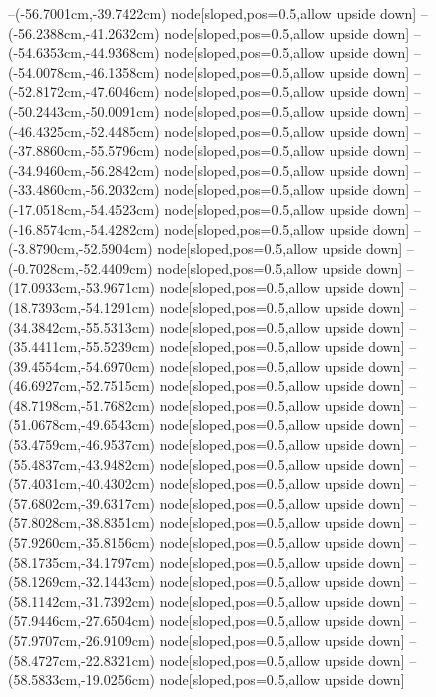 --(-56.7001cm,-39.7422cm) node[sloped,pos=0.5,allow upside down]{\ArrowIn}
--(-56.2388cm,-41.2632cm) node[sloped,pos=0.5,allow upside down]{\ArrowIn}
--(-54.6353cm,-44.9368cm) node[sloped,pos=0.5,allow upside down]{\ArrowIn}
--(-54.0078cm,-46.1358cm) node[sloped,pos=0.5,allow upside down]{\ArrowIn}
--(-52.8172cm,-47.6046cm) node[sloped,pos=0.5,allow upside down]{\ArrowIn}
--(-50.2443cm,-50.0091cm) node[sloped,pos=0.5,allow upside down]{\ArrowIn}
--(-46.4325cm,-52.4485cm) node[sloped,pos=0.5,allow upside down]{\ArrowIn}
--(-37.8860cm,-55.5796cm) node[sloped,pos=0.5,allow upside down]{\ArrowIn}
--(-34.9460cm,-56.2842cm) node[sloped,pos=0.5,allow upside down]{\ArrowIn}
--(-33.4860cm,-56.2032cm) node[sloped,pos=0.5,allow upside down]{\ArrowIn}
--(-17.0518cm,-54.4523cm) node[sloped,pos=0.5,allow upside down]{\ArrowIn}
--(-16.8574cm,-54.4282cm) node[sloped,pos=0.5,allow upside down]{\arrowIn}
--(-3.8790cm,-52.5904cm) node[sloped,pos=0.5,allow upside down]{\ArrowIn}
--(-0.7028cm,-52.4409cm) node[sloped,pos=0.5,allow upside down]{\ArrowIn}
--(17.0933cm,-53.9671cm) node[sloped,pos=0.5,allow upside down]{\ArrowIn}
--(18.7393cm,-54.1291cm) node[sloped,pos=0.5,allow upside down]{\ArrowIn}
--(34.3842cm,-55.5313cm) node[sloped,pos=0.5,allow upside down]{\ArrowIn}
--(35.4411cm,-55.5239cm) node[sloped,pos=0.5,allow upside down]{\ArrowIn}
--(39.4554cm,-54.6970cm) node[sloped,pos=0.5,allow upside down]{\ArrowIn}
--(46.6927cm,-52.7515cm) node[sloped,pos=0.5,allow upside down]{\ArrowIn}
--(48.7198cm,-51.7682cm) node[sloped,pos=0.5,allow upside down]{\ArrowIn}
--(51.0678cm,-49.6543cm) node[sloped,pos=0.5,allow upside down]{\ArrowIn}
--(53.4759cm,-46.9537cm) node[sloped,pos=0.5,allow upside down]{\ArrowIn}
--(55.4837cm,-43.9482cm) node[sloped,pos=0.5,allow upside down]{\ArrowIn}
--(57.4031cm,-40.4302cm) node[sloped,pos=0.5,allow upside down]{\ArrowIn}
--(57.6802cm,-39.6317cm) node[sloped,pos=0.5,allow upside down]{\arrowIn}
--(57.8028cm,-38.8351cm) node[sloped,pos=0.5,allow upside down]{\arrowIn}
--(57.9260cm,-35.8156cm) node[sloped,pos=0.5,allow upside down]{\ArrowIn}
--(58.1735cm,-34.1797cm) node[sloped,pos=0.5,allow upside down]{\ArrowIn}
--(58.1269cm,-32.1443cm) node[sloped,pos=0.5,allow upside down]{\ArrowIn}
--(58.1142cm,-31.7392cm) node[sloped,pos=0.5,allow upside down]{\arrowIn}
--(57.9446cm,-27.6504cm) node[sloped,pos=0.5,allow upside down]{\ArrowIn}
--(57.9707cm,-26.9109cm) node[sloped,pos=0.5,allow upside down]{\arrowIn}
--(58.4727cm,-22.8321cm) node[sloped,pos=0.5,allow upside down]{\ArrowIn}
--(58.5833cm,-19.0256cm) node[sloped,pos=0.5,allow upside down]{\ArrowIn}
